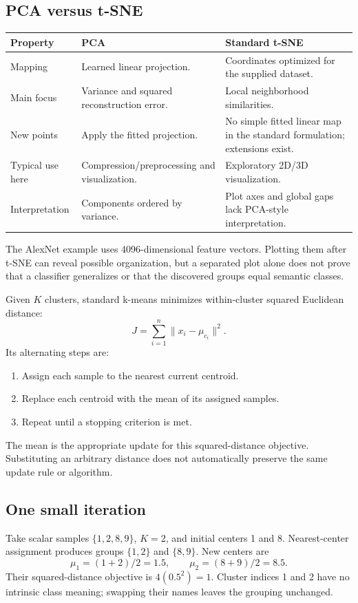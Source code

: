\documentclass[11pt]{article}
\begin{document}
\subsection{PCA versus t-SNE}
\begin{longtable}{@{}P{.25\textwidth}P{.32\textwidth}P{.33\textwidth}@{}}
\toprule Property & PCA & Standard t-SNE\\\midrule\endhead
Mapping & Learned linear projection. & Coordinates optimized for the supplied dataset.\\
Main focus & Variance and squared reconstruction error. & Local neighborhood similarities.\\
New points & Apply the fitted projection. & No simple fitted linear map in the standard formulation; extensions exist.\\
Typical use here & Compression/preprocessing and visualization. & Exploratory 2D/3D visualization.\\
Interpretation & Components ordered by variance. & Plot axes and global gaps lack PCA-style interpretation.\\\bottomrule
\end{longtable}
The AlexNet example uses 4096-dimensional feature vectors. Plotting them after t-SNE can reveal possible organization, but a separated plot alone does not prove that a classifier generalizes or that the discovered groups equal semantic classes.

Given $K$ clusters, standard k-means minimizes within-cluster squared Euclidean distance:
\[
J=\sum_{i=1}^{n}\|x_i-\mu_{c_i}\|^2.
\]
Its alternating steps are:
\begin{enumerate}
\item Assign each sample to the nearest current centroid.
\item Replace each centroid with the mean of its assigned samples.
\item Repeat until a stopping criterion is met.
\end{enumerate}
The mean is the appropriate update for this squared-distance objective. Substituting an arbitrary distance does not automatically preserve the same update rule or algorithm.

\subsection{One small iteration}
Take scalar samples $\{1,2,8,9\}$, $K=2$, and initial centers 1 and 8. Nearest-center assignment produces groups $\{1,2\}$ and $\{8,9\}$. New centers are
\[
\mu_1=(1+2)/2=1.5,\qquad \mu_2=(8+9)/2=8.5.
\]
Their squared-distance objective is $4(0.5^2)=1$. Cluster indices 1 and 2 have no intrinsic class meaning; swapping their names leaves the grouping unchanged.
\end{document}
